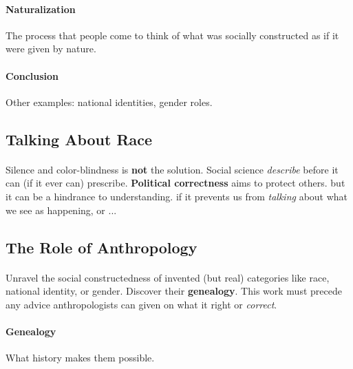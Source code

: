 \documentclass{article}
\begin{document}
	\paragraph{Naturalization} The process that people come to think of what was socially constructed as if it were given by nature.

	\paragraph{Conclusion} 
	\newline Other examples: national identities, gender roles.

	\subsection{Talking About Race}
	\paragraph{} Silence and color-blindness is \textbf{not} the solution.
	\newline Social science \emph{describe} before it can (if it ever can) prescribe.
	\newline \textbf{Political correctness} aims to protect others.
	\newline but it can be a hindrance to understanding.
	\newline if it prevents us from \emph{talking} about what we see as happening,
	\newline or ...

	\subsection{The Role of Anthropology}
	\paragraph{} Unravel the social constructedness of invented (but real) categories like race, national identity, or gender.
	\newline Discover their \textbf{genealogy}.
	\newline This work must precede any advice anthropologists can given on what it right or \emph{correct}.
	\paragraph{Genealogy} What history makes them possible.
\end{document}
